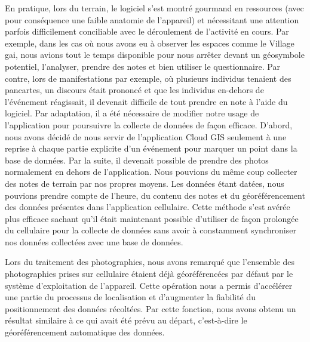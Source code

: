 En pratique, lors du terrain, le logiciel s'est montré gourmand en ressources (avec pour conséquence une faible anatomie de l'appareil) et nécessitant une attention parfois difficilement conciliable avec le déroulement de l'activité en cours.
Par exemple, dans les cas où nous avons eu à observer les espaces comme le Village gai, nous avions tout le temps disponible pour nous arrêter devant un géosymbole potentiel, l'analyser, prendre des notes et bien utiliser le questionnaire.
Par contre, lors de manifestations par exemple, où plusieurs individus tenaient des pancartes, un discours était prononcé et que les individus en-dehors de l'événement réagissait, il devenait difficile de tout prendre en note à l'aide du logiciel.
Par adaptation, il a été nécessaire de modifier notre usage de l'application pour poursuivre la collecte de données de façon efficace.
D'abord, nous avons décidé de nous servir de l'application Cloud GIS seulement à une reprise à chaque partie explicite d'un événement pour marquer un point dans la base de données.
Par la suite, il devenait possible de prendre des photos normalement en dehors de l'application.
Nous pouvions du même coup collecter des notes de terrain par nos propres moyens.
Les données étant datées, nous pouvions prendre compte de l'heure, du contenu des notes et du géoréférencement des données présentes dans l'application cellulaire.
Cette méthode s'est avérée plus efficace sachant qu'il était maintenant possible d'utiliser de façon prolongée du cellulaire pour la collecte de données sans avoir à constamment synchroniser nos données collectées avec une base de données.

Lors du traitement des photographies, nous avons remarqué que l'ensemble des photographies prises sur cellulaire étaient déjà géoréférencées par défaut par le système d'exploitation de l'appareil.
Cette opération nous a permis d'accélérer une partie du processus de localisation et d'augmenter la fiabilité du positionnement des données récoltées.
Par cette fonction, nous avons obtenu un résultat similaire à ce qui avait été prévu au départ, c'est-à-dire le géoréférencement automatique des données.


